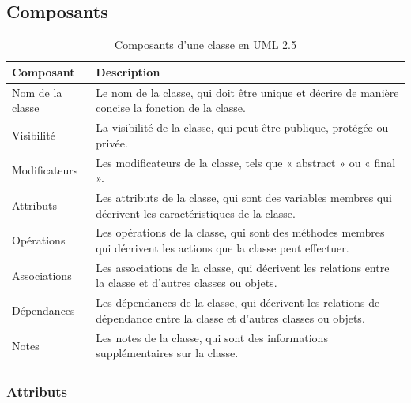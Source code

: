 \subsection{Composants}

\begin{table}[h]
\caption{Composants d'une classe en UML 2.5}
\label{tbl:class_components}
\begin{adjustbox}{max width=\textwidth}
\begin{tabular}{l|l}
\toprule
\textbf{Composant} & \textbf{Description} \\
\midrule
Nom de la classe & Le nom de la classe, qui doit être unique et décrire de manière concise la fonction de la classe. \\
Visibilité & La visibilité de la classe, qui peut être publique, protégée ou privée. \\
Modificateurs & Les modificateurs de la classe, tels que « abstract » ou « final ». \\
Attributs & Les attributs de la classe, qui sont des variables membres qui décrivent les caractéristiques de la classe. \\
Opérations & Les opérations de la classe, qui sont des méthodes membres qui décrivent les actions que la classe peut effectuer. \\
Associations & Les associations de la classe, qui décrivent les relations entre la classe et d'autres classes ou objets. \\
Dépendances & Les dépendances de la classe, qui décrivent les relations de dépendance entre la classe et d'autres classes ou objets. \\
Notes & Les notes de la classe, qui sont des informations supplémentaires sur la classe. \\
\bottomrule
\end{tabular}
\end{adjustbox}
\end{table}
\subsubsection{Attributs}

